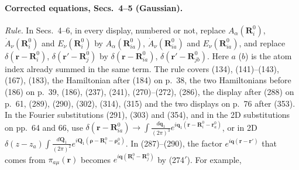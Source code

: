 \paragraph{Corrected equations, Secs.~4--5 (Gaussian).}
\emph{Rule.} In Secs.~4--6, in every display, numbered or not, replace $A_\alpha(\mathbf R^0_i)$, $\dot A_\nu(\mathbf R^0_i)$ and $E_\nu(\mathbf R^0_i)$ by $A_\alpha(\mathbf R^0_{ia})$, $\dot A_\nu(\mathbf R^0_{ia})$ and $E_\nu(\mathbf R^0_{ia})$, and replace $\delta(\mathbf r-\mathbf R^0_i)$, $\delta(\mathbf r'-\mathbf R^0_j)$ by $\delta(\mathbf r-\mathbf R^0_{ia})$, $\delta(\mathbf r'-\mathbf R^0_{jb})$. Here $a$ ($b$) is the atom index already summed in the same term. The rule covers (134), (141)--(143), (167), (183), the Hamiltonian after (184) on p.~38, the two Hamiltonians before (186) on p.~39, (186), (237), (241), (270)--(272), (286), the display after (288) on p.~61, (289), (290), (302), (314), (315) and the two displays on p.~76 after (353). In the Fourier substitutions (291), (303) and (354), and in the 2D substitutions on pp.~64 and 66, use $\delta(\mathbf r-\mathbf R^0_{ia})\to\int\frac{d\mathbf q_1}{(2\pi)^3}e^{i\mathbf q_1(\mathbf r-\mathbf R^0_i-\mathbf r^0_a)}$, or in 2D $\delta(z-z_a)\int\frac{d\mathbf Q_1}{(2\pi)^2}e^{i\mathbf Q_1(\boldsymbol\rho-\mathbf R^0_i-\boldsymbol\rho^0_a)}$. In (287)--(290), the factor $e^{i\mathbf q(\mathbf r-\mathbf r')}$ that comes from $\pi_{a\mu}(\mathbf r)$ becomes $e^{i\mathbf q(\mathbf R^0_i-\mathbf R^0_j)}$ by (274$'$). For example,

